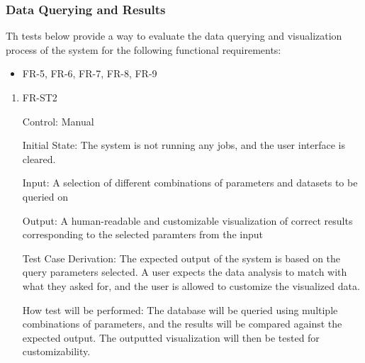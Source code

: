 \documentclass[12pt, titlepage]{article}
\begin{document}
\subsubsection{Data Querying and Results}
Th tests below provide a way to evaluate the data querying and visualization
process of the system for the following functional requirements:
\begin{itemize}
  \item FR-5, FR-6, FR-7, FR-8, FR-9
\end{itemize}
\begin{enumerate}

  \item{FR-ST2}
  
  Control: Manual
            
  Initial State: The system is not running any jobs, and the user interface is
  cleared. 
            
  Input: A selection of different combinations of parameters and datasets to be
  queried on
            
  Output: A human-readable and customizable visualization of correct results
  corresponding to the selected paramters from the input
  
  Test Case Derivation: The expected output of the system is based on the query
  parameters selected. A user expects the data analysis to match with what they
  asked for, and the user is allowed to customize the visualized data.
            
  How test will be performed: The database will be queried using multiple
  combinations of parameters, and the results will be compared against the
  expected output. The outputted visualization will then be tested for
  customizability.
  
  \end{enumerate}
\end{document}
